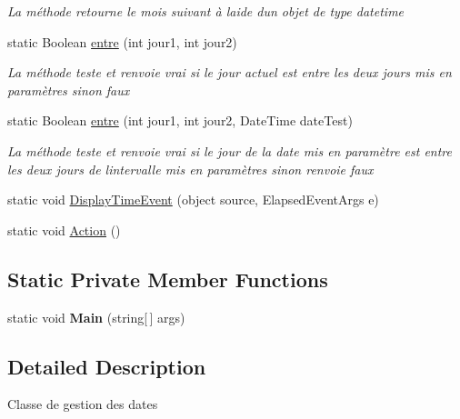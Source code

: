 \begin{DoxyCompactItemize}
\begin{DoxyCompactList}\small\item\em La méthode retourne le mois suivant à l\textquotesingle{}aide d\textquotesingle{}un objet de type datetime \end{DoxyCompactList}\item 
static Boolean \mbox{\hyperlink{classgestion_cloture_1_1gestion_date_a9ee14a2e60b68ffedad925b42a0ad090}{entre}} (int jour1, int jour2)
\begin{DoxyCompactList}\small\item\em La méthode teste et renvoie vrai si le jour actuel est entre les deux jours mis en paramètres sinon faux ~\newline
\end{DoxyCompactList}\item 
static Boolean \mbox{\hyperlink{classgestion_cloture_1_1gestion_date_a8c1ca7bb5e1827fd1a120d6933f83d49}{entre}} (int jour1, int jour2, Date\+Time date\+Test)
\begin{DoxyCompactList}\small\item\em La méthode teste et renvoie vrai si le jour de la date mis en paramètre est entre les deux jours de l\textquotesingle{}intervalle mis en paramètres sinon renvoie faux ~\newline
\end{DoxyCompactList}\item 
static void \mbox{\hyperlink{classgestion_cloture_1_1gestion_date_a6646013d65b640490269556de333607c}{Display\+Time\+Event}} (object source, Elapsed\+Event\+Args e)
\item 
static void \mbox{\hyperlink{classgestion_cloture_1_1gestion_date_a6fd73af56600e9fb9940729449e8af4f}{Action}} ()
\end{DoxyCompactItemize}
\subsection*{Static Private Member Functions}
\begin{DoxyCompactItemize}
\item 
\mbox{\label{classgestion_cloture_1_1gestion_date_a2162a2a984b4b68e1dee532a2a5f2a4e}} 
static void {\bfseries Main} (string\mbox{[}$\,$\mbox{]} args)
\end{DoxyCompactItemize}


\subsection{Detailed Description}
Classe de gestion des dates 



